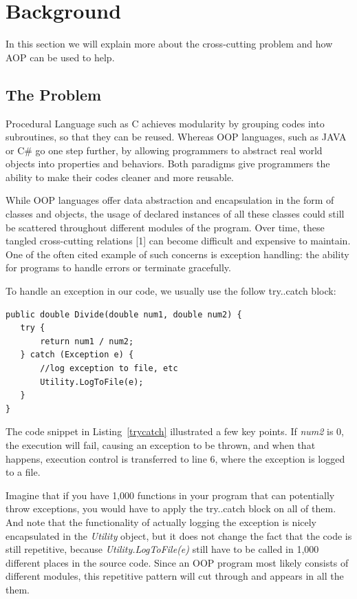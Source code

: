 \section{Background}
In this section we will explain more about the cross-cutting problem and how AOP can be used to help.

\subsection{The Problem}
Procedural Language such as C achieves modularity by grouping codes into subroutines, so that they can be reused. Whereas OOP languages, such as JAVA or C\# go one step further, by allowing programmers to abstract real world objects into properties and behaviors. Both paradigms give programmers the ability to make their codes cleaner and more reusable.

While OOP languages offer data abstraction and encapsulation in the form of classes and objects, the usage of declared instances of all these classes could still be scattered throughout different modules of the program. Over time, these tangled cross-cutting relations [1] can become difficult and expensive to maintain. One of the often cited example of such concerns is exception handling: the ability for programs to handle errors or terminate gracefully.

To handle an exception in our code, we usually use the follow try..catch block:

\begin{lstlisting}[caption={try..catch pattern}, label=trycatch]
public double Divide(double num1, double num2) {
   try {
       return num1 / num2;
   } catch (Exception e) {
       //log exception to file, etc
       Utility.LogToFile(e);
   }
}
\end{lstlisting}

The code snippet in Listing~\ref{trycatch} illustrated a few key points. If {\em num2} is 0, the execution will fail, causing an exception to be thrown, and when that happens, execution control is transferred to line 6, where the exception is logged to a file. 

Imagine that if you have 1,000 functions in your program that can potentially throw exceptions, you would have to apply the try..catch block on all of them. And note that the functionality of actually logging the exception is nicely encapsulated in the {\em Utility} object, but it does not change the fact that the code is still repetitive, because {\em Utility.LogToFile(e)} still have to be called in 1,000 different places in the source code. Since an OOP program most likely consists of different modules, this repetitive pattern will cut through and appears in all the them.

